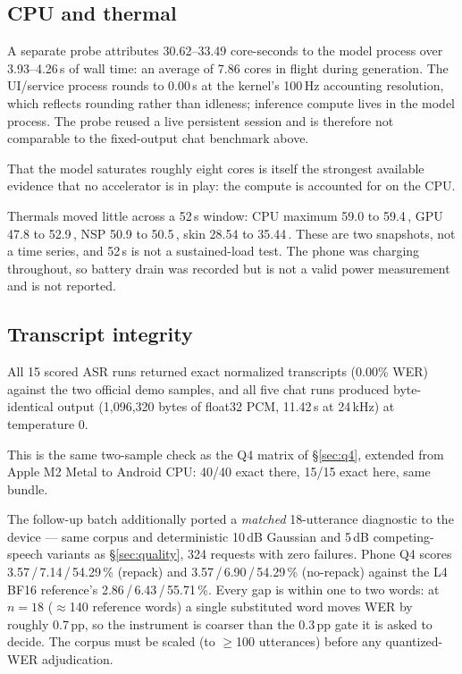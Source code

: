 \documentclass[10pt,twocolumn,letterpaper]{article}
\begin{document}
\subsection{CPU and thermal}

A separate probe attributes 30.62--33.49 core-seconds to the model process
over 3.93--4.26\,s of wall time: an average of 7.86 cores in flight during
generation. The UI/service process rounds to 0.00\,s at the kernel's 100\,Hz
accounting resolution, which reflects rounding rather than idleness; inference
compute lives in the model process. The probe reused a live persistent session
and is therefore not comparable to the fixed-output chat benchmark above.

That the model saturates roughly eight cores is itself the strongest available
evidence that no accelerator is in play: the compute is accounted for on the
CPU.

Thermals moved little across a 52\,s window: CPU maximum 59.0 to
59.4\,\textcelsius{}, GPU 47.8 to 52.9\,\textcelsius{}, NSP 50.9 to
50.5\,\textcelsius{}, skin 28.54 to 35.44\,\textcelsius{}. These are two
snapshots, not a time series, and 52\,s is not a sustained-load test. The
phone was charging throughout, so battery drain was recorded but is not a
valid power measurement and is not reported.

\subsection{Transcript integrity}

All 15 scored ASR runs returned exact normalized transcripts (0.00\% WER)
against the two official demo samples, and all five chat runs produced
byte-identical output (1{,}096{,}320 bytes of float32 PCM, 11.42\,s at
24\,kHz) at temperature 0.

This is the same two-sample check as the Q4 matrix of \S\ref{sec:q4}, extended
from Apple M2 Metal to Android CPU: 40/40 exact there, 15/15 exact here, same
bundle.

The follow-up batch additionally ported a \emph{matched} 18-utterance
diagnostic to the device --- same corpus and deterministic 10\,dB Gaussian and
5\,dB competing-speech variants as \S\ref{sec:quality}, 324 requests with zero
failures. Phone Q4 scores 3.57\,/\,7.14\,/\,54.29\,\% (repack) and
3.57\,/\,6.90\,/\,54.29\,\% (no-repack) against the L4 BF16 reference's
2.86\,/\,6.43\,/\,55.71\,\%. Every gap is within one to two words: at $n{=}18$
($\approx$140 reference words) a single substituted word moves WER by roughly
0.7\,pp, so the instrument is coarser than the 0.3\,pp gate it is asked to
decide. The corpus must be scaled (to $\geq$100 utterances) before any
quantized-WER adjudication.
\end{document}
